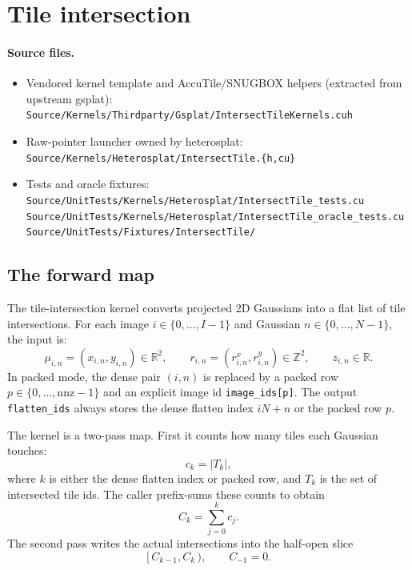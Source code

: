 \documentclass[11pt]{article}
\newcommand{\R}{\mathbb{R}}
\begin{document}
\section{Tile intersection}
\label{sec:intersect-tile}

\paragraph{Source files.}
\begin{itemize}
  \item Vendored kernel template and AccuTile/SNUGBOX helpers
  (extracted from upstream gsplat):\\
  \texttt{Source/Kernels/Thirdparty/Gsplat/IntersectTileKernels.cuh}
  \item Raw-pointer launcher owned by heterosplat:\\
  \texttt{Source/Kernels/Heterosplat/IntersectTile.\{h,cu\}}
  \item Tests and oracle fixtures:\\
  \texttt{Source/UnitTests/Kernels/Heterosplat/IntersectTile\_tests.cu}\\
  \texttt{Source/UnitTests/Kernels/Heterosplat/IntersectTile\_oracle\_tests.cu}\\
  \texttt{Source/UnitTests/Fixtures/IntersectTile/}
\end{itemize}

\subsection{The forward map}

The tile-intersection kernel converts projected 2D Gaussians into a
flat list of tile intersections. For each image $i \in \{0,\dots,I-1\}$
and Gaussian $n \in \{0,\dots,N-1\}$, the input is:
\[
  \mu_{i,n} = (x_{i,n}, y_{i,n}) \in \R^{2}, \qquad
  r_{i,n} = (r^x_{i,n}, r^y_{i,n}) \in \mathbb{Z}^{2}, \qquad
  z_{i,n} \in \R.
\]
In packed mode, the dense pair $(i,n)$ is replaced by a packed row
$p \in \{0,\dots,\mathrm{nnz}-1\}$ and an explicit image id
\texttt{image\_ids[p]}. The output \texttt{flatten\_ids} always stores
the dense flatten index $iN+n$ or the packed row $p$.

The kernel is a two-pass map. First it counts how many tiles each
Gaussian touches:
\[
  c_k = \lvert T_k \rvert,
\]
where $k$ is either the dense flatten index or packed row, and $T_k$
is the set of intersected tile ids. The caller prefix-sums these
counts to obtain
\[
  C_k = \sum_{j=0}^{k} c_j.
\]
The second pass writes the actual intersections into the half-open
slice
\[
  [\, C_{k-1}, C_k \,),
  \qquad C_{-1} = 0.
\]
\end{document}
